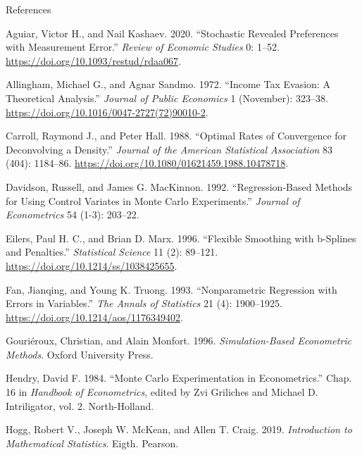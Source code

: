 \documentclass[
  ignorenonframetext,
  aspectratio=169,
]{beamer}
\newlength{\cslhangindent}
\newenvironment{CSLReferences}[2] %
 {\begin{list}{}{%
  \setlength{\itemindent}{0pt}
  \setlength{\leftmargin}{0pt}
  \setlength{\parsep}{0pt}
  \ifodd #1
   \setlength{\leftmargin}{\cslhangindent}
   \setlength{\itemindent}{-1\cslhangindent}
  \fi
  \setlength{\itemsep}{#2\baselineskip}}}
 {\end{list}}
\begin{document}
\begin{frame}{References}
\protect{}\label{references}
\protect{}\label{refs}
\begin{CSLReferences}{1}{1}
Aguiar, Victor H., and Nail Kashaev. 2020. {``Stochastic Revealed
Preferences with Measurement Error.''} \emph{Review of Economic Studies}
0: 1--52. \url{https://doi.org/10.1093/restud/rdaa067}.

Allingham, Michael G., and Agnar Sandmo. 1972. {``Income Tax Evasion: A
Theoretical Analysis.''} \emph{Journal of Public Economics} 1
(November): 323--38. \url{https://doi.org/10.1016/0047-2727(72)90010-2}.

Carroll, Raymond J., and Peter Hall. 1988. {``Optimal Rates of
Convergence for Deconvolving a Density.''} \emph{Journal of the American
Statistical Association} 83 (404): 1184--86.
\url{https://doi.org/10.1080/01621459.1988.10478718}.

Davidson, Russell, and James G. MacKinnon. 1992. {``Regression-Based
Methods for Using Control Variates in Monte Carlo Experiments.''}
\emph{Journal of Econometrics} 54 (1-3): 203--22.

Eilers, Paul H. C., and Brian D. Marx. 1996. {``Flexible Smoothing with
b-Splines and Penalties.''} \emph{Statistical Science} 11 (2): 89--121.
\url{https://doi.org/10.1214/ss/1038425655}.

Fan, Jianqing, and Young K. Truong. 1993. {``Nonparametric Regression
with Errors in Variables.''} \emph{The Annals of Statistics} 21 (4):
1900--1925. \url{https://doi.org/10.1214/aos/1176349402}.

Gouriéroux, Christian, and Alain Monfort. 1996. \emph{Simulation-Based
Econometric Methods}. Oxford University Press.

Hendry, David F. 1984. {``Monte Carlo Experimentation in
Econometrics.''} Chap. 16 in \emph{Handbook of Econometrics}, edited by
Zvi Griliches and Michael D. Intriligator, vol. 2. North-Holland.

Hogg, Robert V., Joseph W. McKean, and Allen T. Craig. 2019.
\emph{Introduction to Mathematical Statistics}. Eigth. Pearson.


\end{CSLReferences}
\end{frame}
\end{document}
